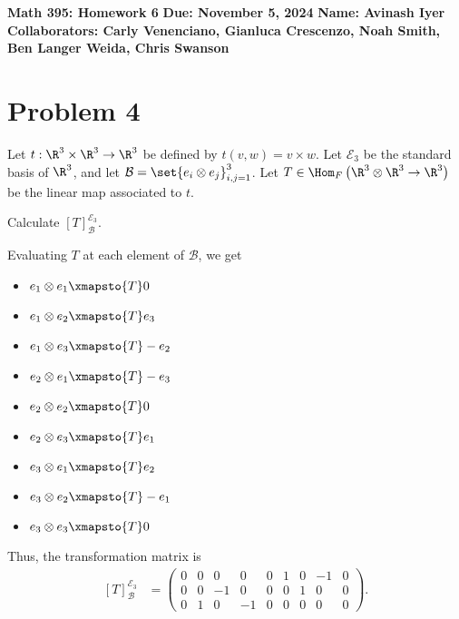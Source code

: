 \documentclass[10pt]{mypackage}
\begin{document}
\RaggedRight
\begin{center}
  \textbf{Math 395: Homework 6}\break
  \textbf{Due: November 5, 2024}\break
  \textbf{Name: Avinash Iyer}\break
  \textbf{Collaborators: Carly Venenciano, Gianluca Crescenzo, Noah Smith, Ben Langer Weida, Chris Swanson}
\end{center}
\section{Problem 4}%
\begin{problem}
  Let $t: \R^3\times\R^3\rightarrow \R^3$ be defined by $t\left(v,w\right) = v\times w$. Let $\mathcal{E}_3$ be the standard basis of $\R^3$, and let $\mathcal{B} = \set{e_i\otimes e_j}_{i,j=1}^{3}$. Let $T\in \Hom_{F}\left(\R^3\otimes\R^3\rightarrow \R^3\right)$ be the linear map associated to $t$.\newline

  Calculate $\left[T\right]_{\mathcal{B}}^{\mathcal{E}_3}$.
\end{problem}
\begin{solution}
  Evaluating $T$ at each element of $\mathcal{B}$, we get
  \begin{itemize}
    \footnotesize
    \item $e_1\otimes e_1 \xmapsto{T} 0$
    \item $e_1\otimes e_2 \xmapsto{T} e_3$
    \item $e_1\otimes e_3 \xmapsto{T}-e_2$
    \item $e_2\otimes e_1 \xmapsto{T} -e_3$
    \item $e_2\otimes e_2 \xmapsto{T} 0$
    \item $e_2\otimes e_3 \xmapsto{T} e_1$
    \item $e_3\otimes e_1 \xmapsto{T} e_2$
    \item $e_3\otimes e_2 \xmapsto{T} -e_1$
    \item $e_3\otimes e_3 \xmapsto{T} 0$
\end{itemize}
  Thus, the transformation matrix is
  \begin{align*}
    \left[T\right]_{\mathcal{B}}^{\mathcal{E}_3} &= \begin{pmatrix} 0 & 0 & 0 & 0 & 0 & 1 & 0 & -1 & 0 \\ 0 & 0 & -1 & 0 & 0 & 0 & 1 & 0 & 0 \\ 0 & 1 & 0 & -1 & 0 & 0 & 0 & 0 & 0\end{pmatrix}.
  \end{align*}
  
\end{solution}
\end{document}
